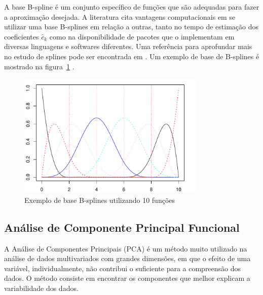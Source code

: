 \documentclass[
	12pt,				%
	openright,			%
	oneside,			%
	a4paper,			%
	english,			%
	brazil				%
	]{dissertacao-ufrgs-abntex2}
\begin{document}
A base B-spline é um conjunto específico de funções que são adequadas para fazer a aproximação desejada.
A literatura cita vantagens computacionais em se utilizar uma base B-splines em relação a outras, tanto no tempo de estimação dos coeficientes $\hat{c}_k$ como na disponibilidade de pacotes que o implementam em diversas linguagens e softwares diferentes.
Uma referência para aprofundar mais no estudo de splines pode ser encontrada em . Um exemplo de base de B-splines é mostrado na figura~\ref{fig:base-bspline} .
\begin{figure}[h!] \label{fig:base-bspline}
  \centering
    \includegraphics[width=0.8\textwidth]{anexos/base_bsplines1}
  \caption{Exemplo de base B-splines utilizando 10 funções}
\end{figure}

\subsection{Análise de Componente Principal Funcional}
\label{FPCA}

 A Análise de Componentes Principais (PCA) é um método muito utilizado na análise de dados multivariados com grandes dimensões, em que o efeito de uma variável, individualmente, não contribui o suficiente para a compreensão dos dados. O método consiste em encontrar os componentes que melhor explicam a variabilidade dos dados. 
\end{document}
